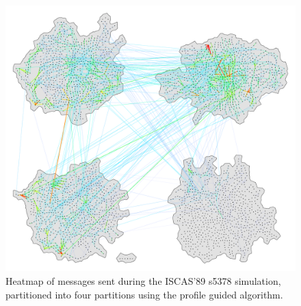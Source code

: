 \documentclass[11pt]{book}
\begin{document}
\begin{figure}
\centering
\includegraphics[width=\textwidth,height=0.9\textheight,keepaspectratio]{figs/s5378_4part}
\caption{Heatmap of messages sent during the ISCAS'89 s5378 simulation, partitioned into four partitions using the profile guided algorithm.}
\end{figure}
\end{document}
